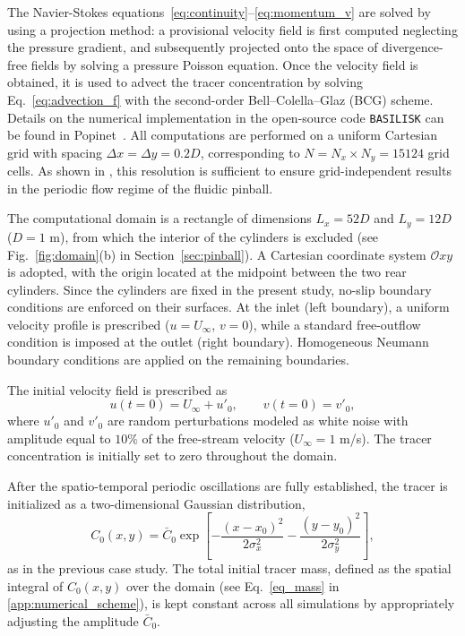 \documentclass{article}
\begin{document}
The Navier-Stokes equations~\eqref{eq:continuity}--\eqref{eq:momentum_v} are solved by using a projection method: a provisional velocity field is first computed neglecting the pressure gradient, and subsequently projected onto the space of divergence-free fields by solving a pressure Poisson equation. Once the velocity field is obtained, it is used to advect the tracer concentration by solving Eq.~\eqref{eq:advection_f} with the second-order Bell--Colella--Glaz (BCG) scheme. Details on the numerical implementation in the open-source code \texttt{BASILISK} can be found in Popinet~\cite{Popinet2003}. All computations are performed on a uniform Cartesian grid with spacing $\Delta x = \Delta y = 0.2 D$, corresponding to $N = N_x \times N_y = 15124$ grid cells. As shown in \cite{DellaPia_diffusion_2024}, this resolution is sufficient to ensure grid-independent results in the periodic flow regime of the fluidic pinball.

The computational domain is a rectangle of dimensions $L_x = 52D$ and $L_y = 12D$ ($D = 1$ m), from which the interior of the cylinders is excluded (see Fig.~\ref{fig:domain}(b) in Section~\ref{sec:pinball}). A Cartesian coordinate system $\mathcal{O}xy$ is adopted, with the origin located at the midpoint between the two rear cylinders. Since the cylinders are fixed in the present study, no-slip boundary conditions are enforced on their surfaces. At the inlet (left boundary), a uniform velocity profile is prescribed ($u = U_\infty$, $v = 0$), while a standard free-outflow condition is imposed at the outlet (right boundary). Homogeneous Neumann boundary conditions are applied on the remaining boundaries.

The initial velocity field is prescribed as
\begin{equation}
\label{eq:init}
u(t=0) = U_\infty + u'_0, \qquad v(t=0) = v'_0,
\end{equation}
where $u'_0$ and $v'_0$ are random perturbations modeled as white noise with amplitude equal to $10\%$ of the free-stream velocity ($U_\infty = 1$ m/s). The tracer concentration is initially set to zero throughout the domain.

After the spatio-temporal periodic oscillations are fully established, the tracer is initialized as a two-dimensional Gaussian distribution,
\begin{equation}
C_0(x,y) = \bar{C}_0 
\exp\!\left[-\frac{(x-x_0)^2}{2\sigma_x^2} - \frac{(y-y_0)^2}{2\sigma_y^2}\right],
\label{eq:initial_condition_pinball}
\end{equation}
as in the previous case study. The total initial tracer mass, defined as the spatial integral of $C_0(x,y)$ over the domain (see Eq.~\eqref{eq_mass} in \ref{app:numerical_scheme}), is kept constant across all simulations by appropriately adjusting the amplitude $\bar{C}_0$.
\end{document}
